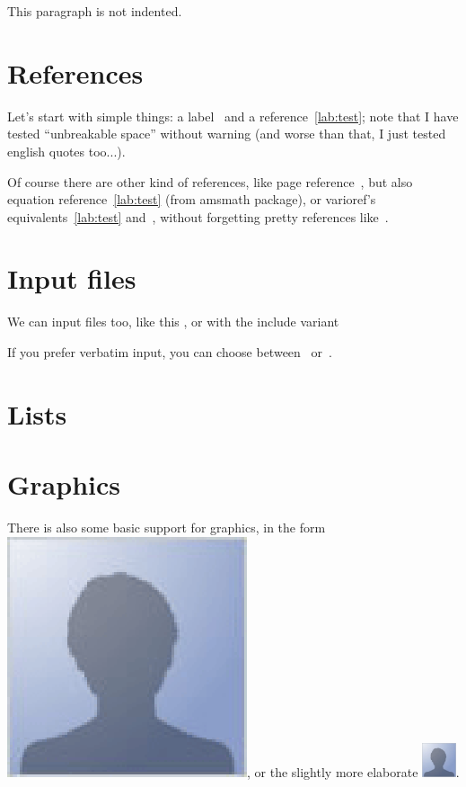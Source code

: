 \documentclass[a4paper,12pt]{article}
\begin{document}
\tableofcontents

\noindent This paragraph is not indented.

\section{References}

Let's start with simple things: a label~\label{lab:test} and a
reference~\ref{lab:test}; note that I have tested ``unbreakable
space'' without warning (and worse than that, I just tested english
quotes too...).

Of course there are other kind of references, like page
reference~\pageref{lab:test}, but also equation
reference~\eqref{lab:test} (from amsmath package), or varioref's
equivalents~\vref{lab:test} and~, without
forgetting pretty references like~.

\section{Input files}

We can input files too, like this , or with the include
variant 

If you prefer verbatim input, you can choose
between~ or~.

\section{Lists}

\listoffigures
\listoftables

\section{Graphics}

There is also some basic support for graphics, in the form
\includegraphics{foo.eps}, or the slightly more elaborate
\includegraphics[height=1cm, width=1cm]{foo.eps}.
\end{document}
